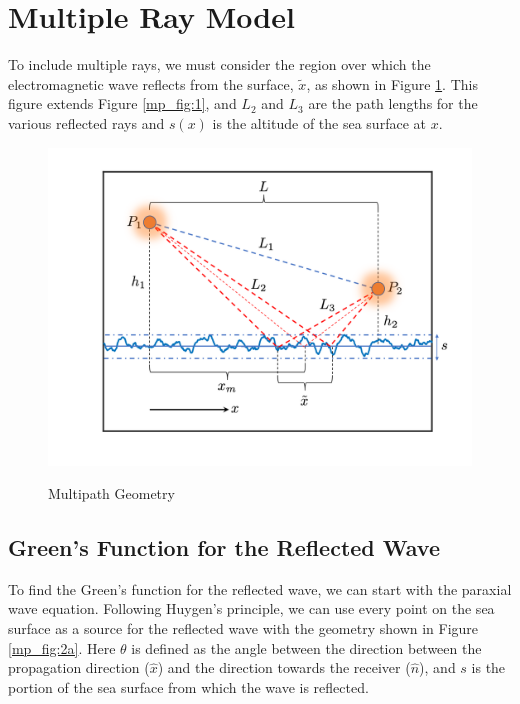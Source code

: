 \section{Multiple Ray Model}
To include multiple rays, we must consider the region over which the electromagnetic wave reflects from the surface, $\tilde{x}$, as shown in Figure \ref{mp_fig:2}. This figure extends Figure \ref{mp_fig:1}, and  $L_2$ and $L_3$ are the path lengths for the various reflected rays and $s(x)$ is the altitude of the sea surface at $x$. 

\begin{figure}[H]
  \begin{center}
\includegraphics[width=5in]{../media/analysis/multipath_layout.png}
  \end{center}
  \renewcommand{\baselinestretch}{1} \small\normalsize
  \begin{quote}
    \caption[Multipath Geometry ]{Multipath Geometry\label{mp_fig:2}}
  \end{quote}
\end{figure}
\renewcommand{\baselinestretch}{2} \small\normalsize

\subsection{Green's Function for the Reflected Wave}
To find the Green's function for the reflected wave, we can start with the paraxial wave equation. Following Huygen's principle, we can use every point on the sea surface as a source for the reflected wave with the geometry shown in Figure \ref{mp_fig:2a}. Here $\theta$ is defined as the angle between the direction between the propagation direction ($\hat{x}$) and the direction towards the receiver ($\hat{n}$), and $s$ is the portion of the sea surface from which the wave is reflected.

